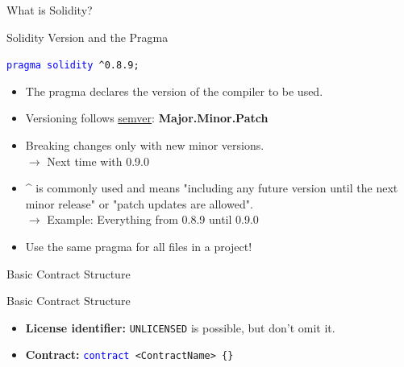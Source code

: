 \documentclass[handout]{beamer}
\begin{document}
\begin{frame}{What is Solidity?}
\vspace{1em}
	

\end{frame}


\begin{frame}{Solidity Version and the Pragma}

	\texttt{\textcolor{blue}{pragma solidity} \^{}0.8.9;}
\vspace{1em}
	\begin{itemize}
		\item<1-> The pragma declares the version of the compiler to be used.
 		\item<2-> Versioning follows \link \href{https://semver.org/}{semver}: \textbf{Major.Minor.Patch}
 		\item<3-> Breaking changes only with new minor versions. \\ {\small $\rightarrow$ Next time with 0.9.0}
		\item<4->  \^{} is commonly used and means "including any future version until the next minor release" or "patch updates are allowed". \\
 {$\rightarrow$ \small Example: Everything from 0.8.9 until 0.9.0}
 		\item<5-> Use the same pragma for all files in a project!
	\end{itemize}
	
\end{frame}


\begin{frame}{Basic Contract Structure}

	\begin{samplecode}{Basic Contract Structure}
		
	\end{samplecode}
	\vspace{1em}
	\begin{itemize}
		\item \textbf{License identifier:} \texttt{UNLICENSED} is possible, but don't omit it.
		\item \textbf{Contract:} \texttt{\textcolor{blue}{contract} <ContractName> \{\}}
	\end{itemize}

\end{frame}
\end{document}
